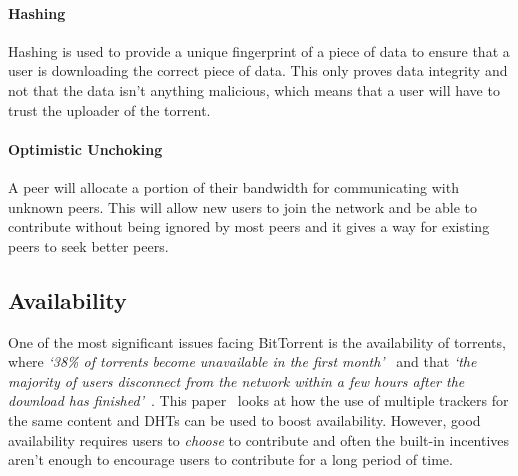 \paragraph*{Hashing}
Hashing is used to provide a unique fingerprint of a piece of data to ensure that a user is downloading the correct piece of data. This only proves data integrity and not that the data isn't anything malicious, which means that a user will have to trust the uploader of the torrent.

\paragraph*{Optimistic Unchoking}
A peer will allocate a portion of their bandwidth for communicating with unknown peers. This will allow new users to join the network and be able to contribute without being ignored by most peers and it gives a way for existing peers to seek better peers.

\subsection*{Availability}\label{subsec:availability}

One of the most significant issues facing BitTorrent is the availability of torrents, where \textit{`38\% of torrents become unavailable in the first month'}~\cite{kaune_unraveling_2010} and that \textit{`the majority of users disconnect from the network within a few hours after the download has finished'}~\cite{pouwelse_bittorrent_2005}.
This paper~\cite{neglia_availability_2007} looks at how the use of multiple trackers for the same content and DHTs can be used to boost availability. 
However, good availability requires users to \textit{choose} to contribute and often the built-in incentives aren't enough to encourage users to contribute for a long period of time.
